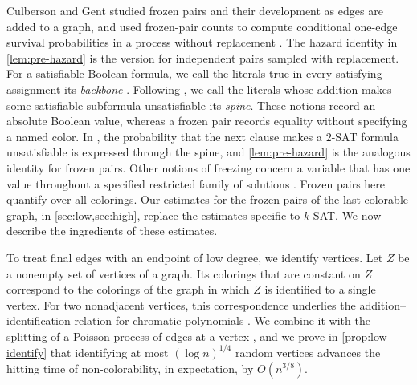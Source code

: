 Culberson and Gent studied frozen pairs and their development as edges are added to a graph, and used frozen-pair counts to compute conditional one-edge survival probabilities in a process without replacement \cite[Sections~2.1 and~3.3]{culberson2001frozen}. The hazard identity in \cref{lem:pre-hazard} is the version for independent pairs sampled with replacement. For a satisfiable Boolean formula, we call the literals true in every satisfying assignment its \emph{backbone} \cite{monasson1996entropy,monasson1999determining}. Following \cite{bollobas2001scaling}, we call the literals whose addition makes some satisfiable subformula unsatisfiable its \emph{spine}. These notions record an absolute Boolean value, whereas a frozen pair records equality without specifying a named color. In \cite[Section~3.3]{bollobas2001scaling}, the probability that the next clause makes a $2$-SAT formula unsatisfiable is expressed through the spine, and \cref{lem:pre-hazard} is the analogous identity for frozen pairs. Other notions of freezing concern a variable that has one value throughout a specified restricted family of solutions \cite{achlioptas2009random,molloy2018freezing,semerjian2008freezing}. Frozen pairs here quantify over all colorings. Our estimates for the frozen pairs of the last colorable graph, in \cref{sec:low,sec:high}, replace the estimates specific to $k$-SAT. We now describe the ingredients of these estimates.

To treat final edges with an endpoint of low degree, we identify vertices. Let $Z$ be a nonempty set of vertices of a graph. Its colorings that are constant on $Z$ correspond to the colorings of the graph in which $Z$ is identified to a single vertex. For two nonadjacent vertices, this correspondence underlies the addition--identification relation for chromatic polynomials \cite[Section~3, Theorem~1]{read1968introduction}. We combine it with the splitting of a Poisson process of edges at a vertex \cite[Theorems~5.2, 5.6, and~5.8, Corollary~5.9]{last2018lectures}, and we prove in \cref{prop:low-identify} that identifying at most $(\log n)^{1/4}$ random vertices advances the hitting time of non-colorability, in expectation, by $O(n^{3/8})$.

